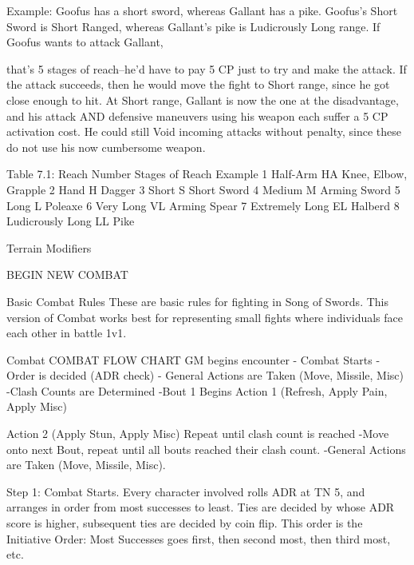 \documentclass[oneside,11pt,english]{book}
\begin{document}
 

Example: Goofus has a short sword, whereas Gallant has a pike. Goofus’s Short Sword is Short 
Ranged, whereas Gallant’s pike is Ludicrously Long range. If Goofus wants to attack Gallant, 


that’s 5 stages of reach--he’d have to pay 5 CP just to try and make the attack. If the attack 
succeeds, then he would move the fight to Short range, since he got close enough to hit. At Short 
range, Gallant is now the one at the disadvantage, and his attack AND defensive maneuvers 
using his weapon each suffer a 5 CP activation cost. He could still Void incoming attacks without 
penalty, since these do not use his now cumbersome weapon. 

 

Table 7.1: Reach 
Number Stages of Reach Example 
1 Half-Arm HA Knee, Elbow, Grapple 
2 Hand H Dagger 
3 Short S Short Sword 
4 Medium M Arming Sword 
5 Long L Poleaxe 
6 Very Long VL Arming Spear 
7 Extremely Long EL Halberd 
8 Ludicrously Long LL Pike 

 

 

 

Terrain Modifiers 

 

 

BEGIN NEW COMBAT 

 

Basic Combat Rules 
These are basic rules for fighting in Song of Swords. This version of Combat works best for 
representing small fights where individuals face each other in battle 1v1. 

 

Combat 
COMBAT FLOW CHART 
GM begins encounter 
- Combat Starts 
- Order is decided (ADR check) 
- General Actions are Taken (Move, Missile, Misc) 
-Clash Counts are Determined 
-Bout 1 Begins 
 Action 1 (Refresh, Apply Pain, Apply Misc) 


 Action 2 (Apply Stun, Apply Misc) 
 Repeat until clash count is reached 
-Move onto next Bout, repeat until all bouts reached their clash count. 
-General Actions are Taken (Move, Missile, Misc). 

 

 

 

 

Step 1: Combat Starts. Every character involved rolls ADR at TN 5, and arranges in order from 
most successes to least. Ties are decided by whose ADR score is higher, subsequent ties are 
decided by coin flip. This order is the Initiative Order: Most Successes goes first, then second 
most, then third most, etc. 
\end{document}
